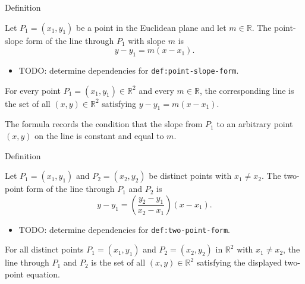 \begin{definitionbox}{Definition}
\begin{definition}
\label{def:point-slope-form}
Let $P_1=(x_1,y_1)$ be a point in the Euclidean plane and let
$m\in\mathbb{R}$. The point-slope form of the line through $P_1$ with slope
$m$ is
\[
  y-y_1=m(x-x_1).
\]
\end{definition}
\end{definitionbox}

\begin{dependencies}
\begin{itemize}
  \item TODO: determine dependencies for \texttt{def:point-slope-form}.
\end{itemize}
\end{dependencies}

\begin{remark*}
For every point $P_1=(x_1,y_1)\in\mathbb{R}^2$ and every
$m\in\mathbb{R}$, the corresponding line is the set of all
$(x,y)\in\mathbb{R}^2$ satisfying $y-y_1=m(x-x_1)$.
\end{remark*}

\begin{remark*}[Derivation]
The formula records the condition that the slope from $P_1$ to an arbitrary
point $(x,y)$ on the line is constant and equal to $m$.
\end{remark*}

\begin{definitionbox}{Definition}
\begin{definition}
\label{def:two-point-form}
Let $P_1=(x_1,y_1)$ and $P_2=(x_2,y_2)$ be distinct points with
$x_1\neq x_2$. The two-point form of the line through $P_1$ and $P_2$ is
\[
  y-y_1=\left(\frac{y_2-y_1}{x_2-x_1}\right)(x-x_1).
\]
\end{definition}
\end{definitionbox}

\begin{dependencies}
\begin{itemize}
  \item TODO: determine dependencies for \texttt{def:two-point-form}.
\end{itemize}
\end{dependencies}

\begin{remark*}
For all distinct points $P_1=(x_1,y_1)$ and $P_2=(x_2,y_2)$ in
$\mathbb{R}^2$ with $x_1\neq x_2$, the line through $P_1$ and $P_2$ is the set
of all $(x,y)\in\mathbb{R}^2$ satisfying the displayed two-point equation.
\end{remark*}

